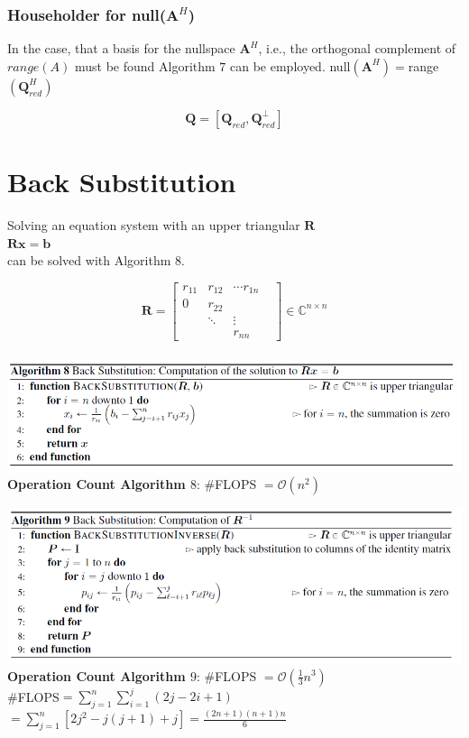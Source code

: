\documentclass[english]{latex4ei/latex4ei_sheet}
\begin{document}
\begin{sectionbox}
	\subsubsection{Householder for null($\mathbf{A}^H$)}
	
In the case, that a basis for the nullspace $\mathbf{A}^H$, i.e., the orthogonal complement of $range(A)$ must be found Algorithm $7$ can be employed. null$(\mathbf{A}^H)=$range$(\mathbf{Q}_{red}^H)$

$$\mathbf{Q} = [\mathbf{Q}_{red}, \mathbf{Q}_{red}^\perp]$$

\end{sectionbox}
\section{Back Substitution}
\begin{sectionbox}
Solving an equation system with an upper triangular $\mathbf{R}$\\
$\mathbf{R}\mathbf{x} = \mathbf{b}$\\
can be solved with Algorithm $8$.


$$\mathbf{R}= \begin{bmatrix}
r_{11} & r_{12} & \cdots r_{1n} \\
0 & r_{22} &\\
& \ddots & \vdots\\
& & r_{nn} & 
\end{bmatrix}\in\mathbb{C}^{n\times n}$$\\

\includegraphics[width=\textwidth]{img/algo8_backsub.png}\\
\textbf{Operation Count Algorithm $8$}: \#FLOPS $=\mathcal{O}(n^2)$\\
\end{sectionbox}

\begin{sectionbox}
\includegraphics[width=\textwidth]{img/algo9_R_inverse.png}\\
\textbf{Operation Count Algorithm $9$}: \#FLOPS $=\mathcal{O}(\frac{1}{3}n^3)$\\

\#FLOPS$=\sum_{j=1}^{n}\sum_{i=1}^{j}(2j-2i+1)$\\
$=\sum_{j=1}^{n}[2j^2-j(j+1)+j] = \frac{(2n+1)(n+1)n}{6}$
\end{sectionbox}
\end{document}
